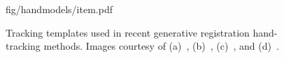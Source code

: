 \begin{figure}[t!]
\centering
\begin{overpic} 
[width=\linewidth]
{fig/handmodels/item.pdf}
\end{overpic}
\caption{
% 
%
Tracking templates used in recent generative registration hand-tracking methods. Images courtesy of
(a)~\protect\cite{oiko2011hand},
(b)~\protect\cite{sridhar2013multicam}, 
(c)~\protect\cite{taylor2016concerto}, and
(d)~\protect\cite{melax2013dynamics}.
% 
% 
}
\label{fig:handmodels}
\end{figure}

